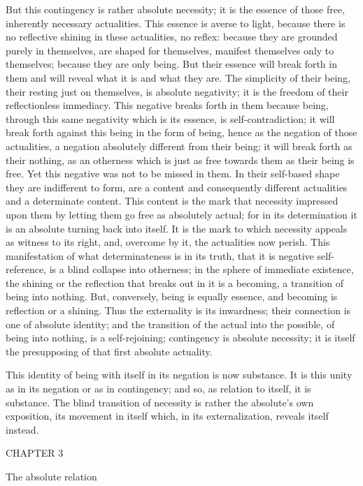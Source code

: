 But this contingency is rather absolute necessity;
it is the essence of those free, inherently necessary actualities.
This essence is averse to light, because there is
no reflective shining in these actualities,
no reflex: because they
are  grounded purely in themselves,
are shaped for themselves,
manifest themselves only to themselves;
because they are only being.
But their essence will break forth in them
and will reveal what it is and what they are.
The simplicity of their being, their resting just on themselves,
is absolute negativity; it is the freedom of their reflectionless immediacy.
This negative breaks forth in them because being,
through this same negativity which is its essence, is self-contradiction;
it will break forth against this being in the form of being,
hence as the negation of those actualities,
a negation absolutely different from their being;
it will break forth as their nothing, as an
otherness which is just as free towards them as their being is free.
Yet this negative was not to be missed in them.
In their self-based shape they are indifferent to form,
are a content and consequently different actualities and a
determinate content.
This content is the mark that necessity impressed upon them
by letting them go free as absolutely actual;
for in its determination it is an absolute turning back into itself.
It is the mark to which necessity appeals as witness to its right,
and, overcome by it, the actualities now perish.
This manifestation of what determinateness is in its truth,
that it is negative self-reference, is a blind collapse into otherness;
in the sphere of immediate existence, the shining
or the reflection that breaks out in it is a becoming,
a transition of being into nothing.
But, conversely, being is equally essence,
and becoming is reflection or a shining.
Thus the externality is its inwardness;
their connection is one of absolute identity;
and the transition of the actual into the possible,
of being into nothing, is a self-rejoining;
contingency is absolute necessity;
it is itself the presupposing of that
first absolute actuality.

This identity of being with itself in its negation is now substance.
It is this unity as in its negation or as in contingency;
and so, as relation to itself, it is substance.
The blind transition of necessity is
rather the absolute's own exposition,
its movement in itself which, in its externalization,
reveals itself instead.

CHAPTER 3

The absolute relation

